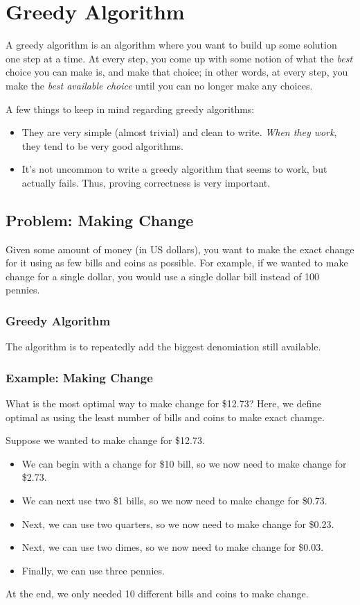 \documentclass[letterpaper]{article}
\begin{document}
\section{Greedy Algorithm}
A greedy algorithm is an algorithm where you want to build up some solution one step at a time. At every step, you come up with some notion of what the \emph{best} choice you can make is, and make that choice; in other words, at every step, you make the \emph{best available choice} until you can no longer make any choices. 

\bigskip 

A few things to keep in mind regarding greedy algorithms:
\begin{itemize}
    \item They are very simple (almost trivial) and clean to write. \emph{When they work}, they tend to be very good algorithms. 
    \item It's not uncommon to write a greedy algorithm that seems to work, but actually fails. Thus, proving correctness is very important. 
\end{itemize}

\subsection{Problem: Making Change}
Given some amount of money (in US dollars), you want to make the exact change for it using as few bills and coins as possible. For example, if we wanted to make change for a single dollar, you would use a single dollar bill instead of 100 pennies. 

\subsubsection{Greedy Algorithm}
The algorithm is to repeatedly add the biggest denomiation still available.

\subsubsection{Example: Making Change}
What is the most optimal way to make change for \$12.73? Here, we define optimal as using the least number of bills and coins to make exact chamge. 

\begin{mdframed}[]
    Suppose we wanted to make change for \$12.73. 
    \begin{itemize}
        \item We can begin with a change for \$10 bill, so we now need to make change for \$2.73.
        \item We can next use two \$1 bills, so we now need to make change for \$0.73. 
        \item Next, we can use two quarters, so we now need to make change for \$0.23.
        \item Next, we can use two dimes, so we now need to make change for \$0.03.
        \item Finally, we can use three pennies. 
    \end{itemize}
    At the end, we only needed 10 different bills and coins to make change.
\end{mdframed}
\end{document}
